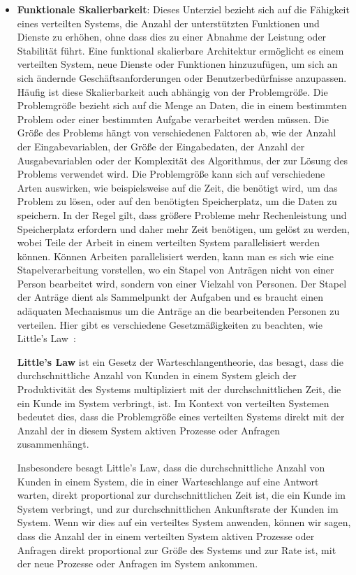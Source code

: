 \documentclass[../vs-script-first-v01.tex]{subfiles}
\begin{document}
\begin{itemize}
\item \textbf{Funktionale Skalierbarkeit}: Dieses Unterziel bezieht sich auf die Fähigkeit eines verteilten Systems, die Anzahl der unterstützten Funktionen und Dienste zu erhöhen, ohne dass dies zu einer Abnahme der Leistung oder Stabilität führt. Eine funktional skalierbare Architektur ermöglicht es einem verteilten System, neue Dienste oder Funktionen hinzuzufügen, um sich an sich ändernde Geschäftsanforderungen oder Benutzerbedürfnisse anzupassen. Häufig ist diese Skalierbarkeit auch abhängig von der Problemgröße. Die Problemgröße bezieht sich auf die Menge an Daten, die in einem bestimmten Problem oder einer bestimmten Aufgabe verarbeitet werden müssen. Die Größe des Problems hängt von verschiedenen Faktoren ab, wie der Anzahl der Eingabevariablen, der Größe der Eingabedaten, der Anzahl der Ausgabevariablen oder der Komplexität des Algorithmus, der zur Lösung des Problems verwendet wird. Die Problemgröße kann sich auf verschiedene Arten auswirken, wie beispielsweise auf die Zeit, die benötigt wird, um das Problem zu lösen, oder auf den benötigten Speicherplatz, um die Daten zu speichern. In der Regel gilt, dass größere Probleme mehr Rechenleistung und Speicherplatz erfordern und daher mehr Zeit benötigen, um gelöst zu werden, wobei Teile der Arbeit in einem verteilten System parallelisiert werden können. Können Arbeiten parallelisiert werden, kann man es sich wie eine Stapelverarbeitung vorstellen, wo ein Stapel von Anträgen nicht von einer Person bearbeitet wird, sondern von einer Vielzahl von Personen. Der Stapel der Anträge dient als Sammelpunkt der Aufgaben und es braucht einen adäquaten Mechanismus um die Anträge an die bearbeitenden Personen zu verteilen. Hier gibt es verschiedene Gesetzmäßigkeiten zu beachten, wie Little's Law~\cite{little1961proof}:

\textbf{Little's Law} ist ein Gesetz der Warteschlangentheorie, das besagt, dass die durchschnittliche Anzahl von Kunden in einem System gleich der Produktivität des Systems multipliziert mit der durchschnittlichen Zeit, die ein Kunde im System verbringt, ist. Im Kontext von verteilten Systemen bedeutet dies, dass die Problemgröße eines verteilten Systems direkt mit der Anzahl der in diesem System aktiven Prozesse oder Anfragen zusammenhängt.

Insbesondere besagt Little's Law, dass die durchschnittliche Anzahl von Kunden in einem System, die in einer Warteschlange auf eine Antwort warten, direkt proportional zur durchschnittlichen Zeit ist, die ein Kunde im System verbringt, und zur durchschnittlichen Ankunftsrate der Kunden im System. Wenn wir dies auf ein verteiltes System anwenden, können wir sagen, dass die Anzahl der in einem verteilten System aktiven Prozesse oder Anfragen direkt proportional zur Größe des Systems und zur Rate ist, mit der neue Prozesse oder Anfragen im System ankommen.


\end{itemize}
\end{document}
